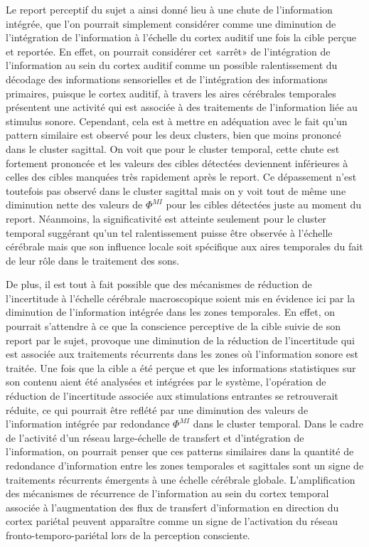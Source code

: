 Le report perceptif du sujet a ainsi donné lieu à une chute de l'information intégrée, que l'on pourrait simplement considérer comme une diminution de l'intégration de l'information à l'échelle du cortex auditif une fois la cible perçue et reportée. 
En effet, on pourrait considérer cet «arrêt» de l'intégration de l'information au sein du cortex auditif comme un possible ralentissement du décodage des informations sensorielles et de l'intégration des informations primaires, puisque le cortex auditif, à travers les aires cérébrales temporales présentent une activité qui est associée à des traitements de l'information liée au stimulus sonore. 
Cependant, cela est à mettre en adéquation avec le fait qu'un pattern similaire est observé pour les deux clusters, bien que moins prononcé dans le cluster sagittal. 
On voit que pour le cluster temporal, cette chute est fortement prononcée et les valeurs des cibles détectées deviennent inférieures à celles des cibles manquées très rapidement après le report. 
Ce dépassement n'est toutefois pas observé dans le cluster sagittal mais on y voit tout de même une diminution nette des valeurs de $\Phi^{MI}$ pour les cibles détectées juste au moment du report. 
Néanmoins, la significativité est atteinte seulement pour le cluster temporal suggérant qu'un tel ralentissement puisse être observée à l'échelle cérébrale mais que son influence locale soit spécifique aux aires temporales du fait de leur rôle dans le traitement des sons. 

De plus, il est tout à fait possible que des mécanismes de réduction de l'incertitude à l'échelle cérébrale macroscopique soient mis en évidence ici par la diminution de l'information intégrée dans les zones temporales. 
En effet, on pourrait s'attendre à ce que la conscience perceptive de la cible suivie de son report par le sujet, provoque une diminution de la réduction de l'incertitude qui est associée aux traitements récurrents dans les zones où l'information sonore est traitée. 
Une fois que la cible a été perçue et que les informations statistiques sur son contenu aient été analysées et intégrées par le système, l'opération de réduction de l'incertitude associée aux stimulations entrantes se retrouverait réduite, ce qui pourrait être reflété par une diminution des valeurs de l'information intégrée par redondance $\Phi^{MI}$ dans le cluster temporal. 
Dans le cadre de l'activité d'un réseau large-échelle de transfert et d'intégration de l'information, on pourrait penser que ces patterns similaires dans la quantité de redondance d'information entre les zones temporales et sagittales sont un signe de traitements récurrents émergents à une échelle cérébrale globale. 
L'amplification des mécanismes de récurrence de l'information au sein du cortex temporal associée à l'augmentation des flux de transfert d'information en direction du cortex pariétal peuvent apparaître comme un signe de l'activation du réseau fronto-temporo-pariétal lors de la perception consciente. 

